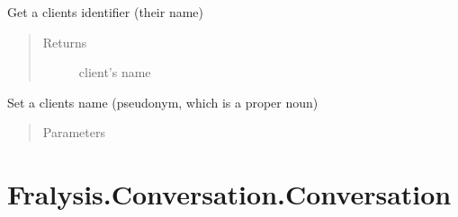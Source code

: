\documentclass[letterpaper,10pt,english]{sphinxmanual}
\begin{document}
\begin{fulllineitems}
\begin{fulllineitems}
\begin{quote}
\begin{description}
\end{description}\end{quote}

\end{fulllineitems}


\begin{fulllineitems}
\label{\detokenize{index:Fralysis.Client.Client.get_name}}
Get a clients identifier (their name)
\begin{quote}\begin{description}
\item[{Returns}] \leavevmode
client’s name

\end{description}\end{quote}

\end{fulllineitems}


\begin{fulllineitems}
\label{\detokenize{index:Fralysis.Client.Client.set_name}}
Set a clients name (pseudonym, which is a proper noun)
\begin{quote}\begin{description}
\item[{Parameters}] \leavevmode
{} \textendash{} 

\end{description}\end{quote}

\end{fulllineitems}


\end{fulllineitems}



\chapter{Fralysis.Conversation.Conversation}
\label{\detokenize{index:fralysis-conversation-conversation}}
\end{document}

